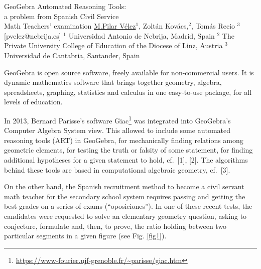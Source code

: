 


\begin{abstract_online}{GeoGebra Automated Reasoning Tools: \\ a problem from Spanish Civil Service \\ Math Teachers' examination}{%
        \underline{M.Pilar V\'elez}$^{1}$, Zolt\'an Kov\'acs,$^{2}$, Tom\'as Recio $^{3}$}{[pvelez@nebrija.es]
        }{%
        $^1$ Universidad Antonio de Nebrija,  Madrid, Spain \newline{}$^2$ The Private University College of Education of the Diocese of Linz,  Austria \newline{}$^3$ Universidad de Cantabria,  Santander, Spain}
    
GeoGebra is open source software, freely available for non-commercial users. It is dynamic mathematics software that brings together geometry, algebra, spreadsheets, graphing, statistics and calculus in one easy-to-use package,  for all levels of education.


 In 2013, Bernard Parisse's software
 Giac\footnote{\url{https://www-fourier.ujf-grenoble.fr/~parisse/giac.htm}}
 was integrated into GeoGebra's Computer Algebra System view. This
 allowed to include some automated reasoning tools (ART) in GeoGebra, for
 mechanically finding relations among geometric elements, for testing the
 truth or falsity of some statement, for finding additional hypotheses
 for a given statement to hold, cf.~[1], [2]. The algorithms behind these
 tools are  based in computational algebraic geometry, cf.~[3].



On the other hand, the Spanish recruitment method to become a civil servant math teacher for the  secondary school system  requires passing and getting the best grades on  a series of  exams (``oposiciones''). In one of these recent tests, the candidates were requested to solve an elementary geometry question, asking to conjecture,  formulate and,  then,  to prove,  the ratio holding between  two  particular segments in a given figure (see Fig. \ref{fig1}).



\begin{figure}[h]
 \centering


\end{figure}
\end{abstract_online}
